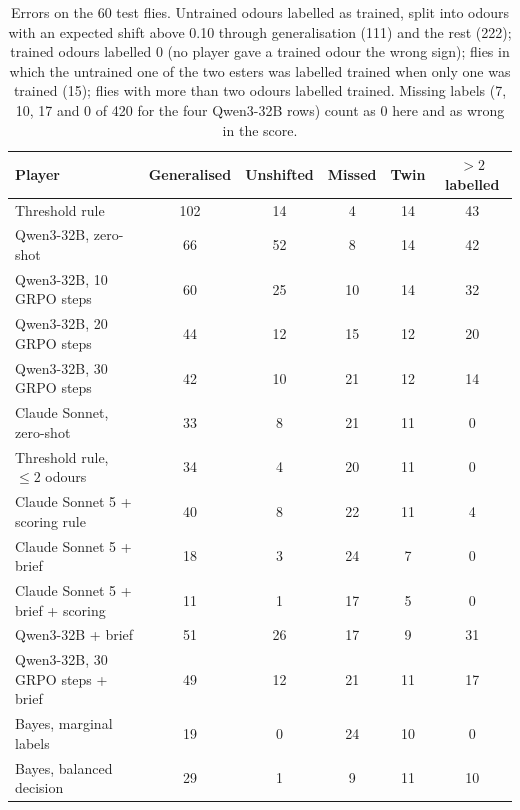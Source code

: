 \begin{table}[h]
\centering
\caption{Errors on the 60 test flies. Untrained odours labelled as trained, split into odours with an expected shift above 0.10 through generalisation (111) and the rest (222); trained odours labelled $0$ (no player gave a trained odour the wrong sign); flies in which the untrained one of the two esters was labelled trained when only one was trained (15); flies with more than two odours labelled trained. Missing labels (7, 10, 17 and 0 of 420 for the four Qwen3-32B rows) count as $0$ here and as wrong in the score.}
\label{tab:errors}
\footnotesize
\begin{tabular}{lccccc}
\toprule
Player & Generalised & Unshifted & Missed & Twin & $>2$ labelled \\
\midrule
Threshold rule & 102 & 14 & 4 & 14 & 43 \\
Qwen3-32B, zero-shot & 66 & 52 & 8 & 14 & 42 \\
Qwen3-32B, 10 GRPO steps & 60 & 25 & 10 & 14 & 32 \\
Qwen3-32B, 20 GRPO steps & 44 & 12 & 15 & 12 & 20 \\
Qwen3-32B, 30 GRPO steps & 42 & 10 & 21 & 12 & 14 \\
Claude Sonnet, zero-shot & 33 & 8 & 21 & 11 & 0 \\
Threshold rule, $\le 2$ odours & 34 & 4 & 20 & 11 & 0 \\
Claude Sonnet 5 + scoring rule & 40 & 8 & 22 & 11 & 4 \\
Claude Sonnet 5 + brief & 18 & 3 & 24 & 7 & 0 \\
Claude Sonnet 5 + brief + scoring & 11 & 1 & 17 & 5 & 0 \\
Qwen3-32B + brief & 51 & 26 & 17 & 9 & 31 \\
Qwen3-32B, 30 GRPO steps + brief & 49 & 12 & 21 & 11 & 17 \\
\midrule
Bayes, marginal labels & 19 & 0 & 24 & 10 & 0 \\
Bayes, balanced decision & 29 & 1 & 9 & 11 & 10 \\
\bottomrule
\end{tabular}
\end{table}

